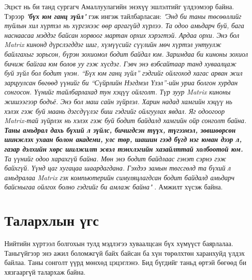 \documentclass[10pt,twocolumn,letterpaper]{article}
\begin{document}
Эцэст нь би танд сургагч Амаллуулагийн энэхүү эшлэлтийг үлдээмээр байна. Тэрээр \textit{"\textbf{бүх юм ганц зүйл}"} гэж ингэж тайлбарласан: \textit{"Энд би таны төсөөллийг туйлын хил хүртэл нь хүргэхээс өөр аргагүйд хүрлээ. Та одоо амьдарч буй, бага наснаасаа мэддэг байсан хорвоог мартан орхих хэрэгтэй. Ардаа орхи. Энэ бол Matrix кинонд дүрслэгддэг шиг, хүмүүсийг сүүлийн мөч хүртэл унтуулж байлгахыг зорьсон, бүрэн зохиомол бодит байдал юм. Заримдаа би киноны зохиол бичиж байгаа юм болов уу гэж хүсдэг. Гэвч энэ вэбсайтаар танд хуваалцаж буй зүйл бол бодит үнэн. “Бүх юм ганц зүйл” гэдгийг ойлгоход хагас арван жил зарцуулсан бөгөөд үүнийг би “Сүйрлийн Нэгдмэл Үзэл”-ийн уриа болгон хурдан сонгосон. Үүнийг тайлбарлахад тун хэцүү ойлголт. Түр зуур Matrix киноны жишээгээр бодъё. Энэ бол маш сайн зүйрлэл. Харин надад хамгийн хэцүү нь хэлэх гэж буй маань дэгсдүүлэг биш гэдгийг ойлгуулах явдал. Яг одоогоор Matrix-тай зүйрлэх нь хэлэх гэж буй бодит байдалд хамгийн ойр сонголт байна. \textbf{Таны амьдрал дахь бүхий л зүйлс, бичигдсэн түүх, түгээмэл, зөвшөөрсөн шинжлэх ухаан болон академи, улс төр, шашин гээд бүгд нэг юман дээр л, газар дэлхийн хөрс шилжилт эсвэл тэнхлэгийн хазайлттай холбоотой юм.} Та үүнийг одоо харахгүй байна. Мөн энэ бодит байдлаас гэнэт сэрнэ гэж байхгүй. Үүнд цаг хугацаа шаардагдана. Гэхдээ замын төгсгөлд та бүхий л амьдралаа Matrix гэх компьютерийн симуляцлагдсан бодит байдалд амьдарч байсныгаа ойлгох болно гэдгийг би амлаж байна"} \cite{33,34}.
Амжилт хүсэж байна.

\section{Талархлын үгс}

Нийтийн хүртээл болгохын тулд мэдлэгээ хуваалцсан бүх хүмүүст баярлалаа. Таньгүйгээр энэ ажил боломжгүй байх байсан ба хүн төрөлхтөн харанхуйд үлдэх байлаа. Таны сонголт үүрд мөнхөд цэцэглэнэ. Бид бүгдийг таньд өртэй бөгөөд би хязгааргүй талархаж байна.

\clearpage
\twocolumn

{\small


}
\end{document}
